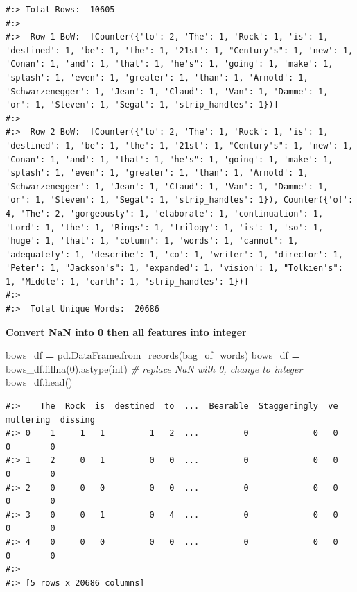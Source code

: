 \documentclass[
]{book}
\newenvironment{Shaded}{\begin{snugshade}}{\end{snugshade}}
\newcommand{\BuiltInTok}[1]{#1}
\newcommand{\CommentTok}[1]{\textcolor[rgb]{0.37,0.37,0.37}{\textit{#1}}}
\newcommand{\DecValTok}[1]{\textcolor[rgb]{0.06,0.06,0.06}{#1}}
\newcommand{\NormalTok}[1]{#1}
\newcommand{\OperatorTok}[1]{\textcolor[rgb]{0.43,0.43,0.43}{\textbf{#1}}}
\begin{document}
\begin{verbatim}
#:> Total Rows:  10605 
#:> 
#:>  Row 1 BoW:  [Counter({'to': 2, 'The': 1, 'Rock': 1, 'is': 1, 'destined': 1, 'be': 1, 'the': 1, '21st': 1, "Century's": 1, 'new': 1, 'Conan': 1, 'and': 1, 'that': 1, "he's": 1, 'going': 1, 'make': 1, 'splash': 1, 'even': 1, 'greater': 1, 'than': 1, 'Arnold': 1, 'Schwarzenegger': 1, 'Jean': 1, 'Claud': 1, 'Van': 1, 'Damme': 1, 'or': 1, 'Steven': 1, 'Segal': 1, 'strip_handles': 1})] 
#:> 
#:>  Row 2 BoW:  [Counter({'to': 2, 'The': 1, 'Rock': 1, 'is': 1, 'destined': 1, 'be': 1, 'the': 1, '21st': 1, "Century's": 1, 'new': 1, 'Conan': 1, 'and': 1, 'that': 1, "he's": 1, 'going': 1, 'make': 1, 'splash': 1, 'even': 1, 'greater': 1, 'than': 1, 'Arnold': 1, 'Schwarzenegger': 1, 'Jean': 1, 'Claud': 1, 'Van': 1, 'Damme': 1, 'or': 1, 'Steven': 1, 'Segal': 1, 'strip_handles': 1}), Counter({'of': 4, 'The': 2, 'gorgeously': 1, 'elaborate': 1, 'continuation': 1, 'Lord': 1, 'the': 1, 'Rings': 1, 'trilogy': 1, 'is': 1, 'so': 1, 'huge': 1, 'that': 1, 'column': 1, 'words': 1, 'cannot': 1, 'adequately': 1, 'describe': 1, 'co': 1, 'writer': 1, 'director': 1, 'Peter': 1, "Jackson's": 1, 'expanded': 1, 'vision': 1, "Tolkien's": 1, 'Middle': 1, 'earth': 1, 'strip_handles': 1})] 
#:> 
#:>  Total Unique Words:  20686
\end{verbatim}

\textbf{Convert NaN into 0 then all features into integer}

\begin{Shaded}
\begin{Highlighting}[]
\NormalTok{bows_df }\OperatorTok{=}\NormalTok{ pd.DataFrame.from_records(bag_of_words)}
\NormalTok{bows_df }\OperatorTok{=}\NormalTok{ bows_df.fillna(}\DecValTok{0}\NormalTok{).astype(}\BuiltInTok{int}\NormalTok{)  }\CommentTok{# replace NaN with 0, change to integer}
\NormalTok{bows_df.head()}
\end{Highlighting}
\end{Shaded}

\begin{verbatim}
#:>    The  Rock  is  destined  to  ...  Bearable  Staggeringly  ve  muttering  dissing
#:> 0    1     1   1         1   2  ...         0             0   0          0        0
#:> 1    2     0   1         0   0  ...         0             0   0          0        0
#:> 2    0     0   0         0   0  ...         0             0   0          0        0
#:> 3    0     0   1         0   4  ...         0             0   0          0        0
#:> 4    0     0   0         0   0  ...         0             0   0          0        0
#:> 
#:> [5 rows x 20686 columns]
\end{verbatim}
\end{document}
